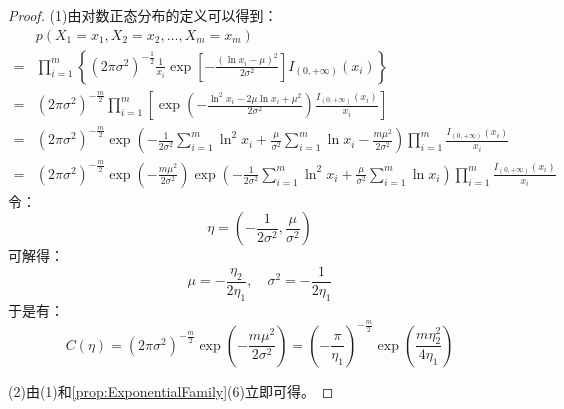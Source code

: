 \begin{proof}
	(1)由对数正态分布的定义可以得到：
	\begin{align*}
		&p(X_1=x_1,X_2=x_2,\dots,X_m=x_m) \\
		=&\prod_{i=1}^{m}\left\{(2\pi\sigma^2)^{-\frac{1}{2}}\frac{1}{x_i}\exp\left[-\frac{(\ln x_i-\mu)^2}{2\sigma^2}\right]I_{(0,+\infty)}(x_i)\right\} \\
		=&(2\pi\sigma^2)^{-\frac{m}{2}}\prod_{i=1}^{m}\left[\exp\left(-\frac{\ln^2 x_i-2\mu\ln x_i+\mu^2}{2\sigma^2}\right)\frac{I_{(0,+\infty)}(x_i)}{x_i}\right] \\
		=&(2\pi\sigma^2)^{-\frac{m}{2}}\exp\left(-\frac{1}{2\sigma^2}\sum_{i=1}^{m}\ln^2 x_i+\frac{\mu}{\sigma^2}\sum_{i=1}^{m}\ln x_i-\frac{m\mu^2}{2\sigma^2}\right)\prod_{i=1}^{m}\frac{I_{(0,+\infty)}(x_i)}{x_i} \\
		=&(2\pi\sigma^2)^{-\frac{m}{2}}\exp\left(-\frac{m\mu^2}{2\sigma^2}\right)\exp\left(-\frac{1}{2\sigma^2}\sum_{i=1}^{m}\ln^2 x_i+\frac{\mu}{\sigma^2}\sum_{i=1}^{m}\ln x_i\right)\prod_{i=1}^{m}\frac{I_{(0,+\infty)}(x_i)}{x_i}
	\end{align*}
	令：
	\begin{equation*}
		\eta=\left(-\frac{1}{2\sigma^2},\frac{\mu}{\sigma^2}\right)
	\end{equation*}
	可解得：
	\begin{equation*}
		\mu=-\frac{\eta_2}{2\eta_1},\quad\sigma^2=-\frac{1}{2\eta_1}
	\end{equation*}
	于是有：
	\begin{equation*}
		C(\eta)=(2\pi\sigma^2)^{-\frac{m}{2}}\exp\left(-\frac{m\mu^2}{2\sigma^2}\right)=\left(-\frac{\pi}{\eta_1}\right)^{-\frac{m}{2}}\exp\left(\frac{m\eta_2^2}{4\eta_1}\right)
	\end{equation*}\par
	(2)由(1)和\cref{prop:ExponentialFamily}(6)立即可得。
\end{proof}


